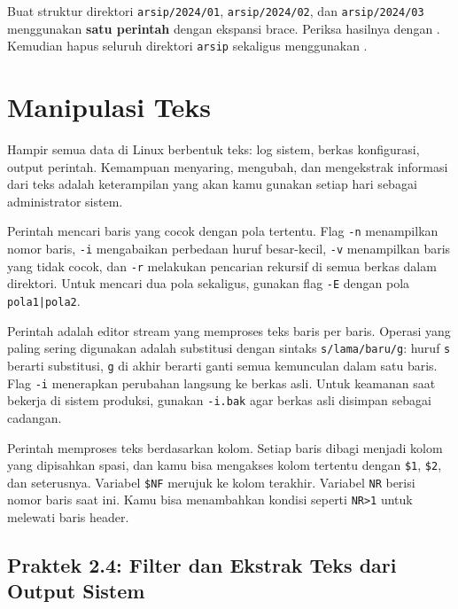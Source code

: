 \begin{challengebox}
Buat struktur direktori \texttt{arsip/2024/01}, \texttt{arsip/2024/02}, dan \texttt{arsip/2024/03} menggunakan \textbf{satu perintah}  dengan ekspansi brace. Periksa hasilnya dengan . Kemudian hapus seluruh direktori \texttt{arsip} sekaligus menggunakan .
\end{challengebox}

\section{Manipulasi Teks}
\label{sec:text-manipulation}

Hampir semua data di Linux berbentuk teks: log sistem, berkas konfigurasi, output perintah. Kemampuan menyaring, mengubah, dan mengekstrak informasi dari teks adalah keterampilan yang akan kamu gunakan setiap hari sebagai administrator sistem.

Perintah  mencari baris yang cocok dengan pola tertentu. Flag \texttt{-n} menampilkan nomor baris, \texttt{-i} mengabaikan perbedaan huruf besar-kecil, \texttt{-v} menampilkan baris yang tidak cocok, dan \texttt{-r} melakukan pencarian rekursif di semua berkas dalam direktori. Untuk mencari dua pola sekaligus, gunakan flag \texttt{-E} dengan pola \texttt{pola1|pola2}.

Perintah  adalah editor stream yang memproses teks baris per baris. Operasi yang paling sering digunakan adalah substitusi dengan sintaks \texttt{s/lama/baru/g}: huruf \texttt{s} berarti substitusi, \texttt{g} di akhir berarti ganti semua kemunculan dalam satu baris. Flag \texttt{-i} menerapkan perubahan langsung ke berkas asli. Untuk keamanan saat bekerja di sistem produksi, gunakan \texttt{-i.bak} agar berkas asli disimpan sebagai cadangan.

Perintah  memproses teks berdasarkan kolom. Setiap baris dibagi menjadi kolom yang dipisahkan spasi, dan kamu bisa mengakses kolom tertentu dengan \texttt{\$1}, \texttt{\$2}, dan seterusnya. Variabel \texttt{\$NF} merujuk ke kolom terakhir. Variabel \texttt{NR} berisi nomor baris saat ini. Kamu bisa menambahkan kondisi seperti \texttt{NR>1} untuk melewati baris header.

\subsection*{Praktek 2.4: Filter dan Ekstrak Teks dari Output Sistem}

